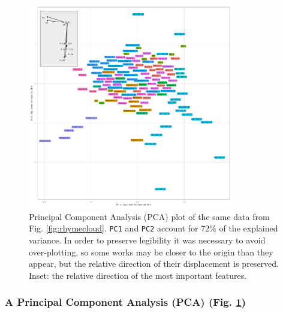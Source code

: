 \documentclass[twocolumn, switch, a4paper]{article} %
\begin{document}
\begin{figure}[ht]
    \caption{
    Principal Component Analysis (PCA) plot of the same data from Fig.
    \ref{fig:rhymecloud}. \texttt{PC1} and \texttt{PC2} account for 72\% of
    the explained variance. In order to preserve legibility it was necessary
    to avoid over-plotting, so some works may be closer to the origin than
    they appear, but the relative direction of their displacement is
    preserved. Inset: the relative direction of the most important features.
    }
    \label{fig:rhymepca}
    \centering
    \includegraphics[width=0.8\textwidth]{rhyme_pca_arrows.pdf}
\end{figure}

\subsubsection{A Principal Component Analysis (PCA) (Fig. \ref{fig:rhymepca})}
\end{document}
